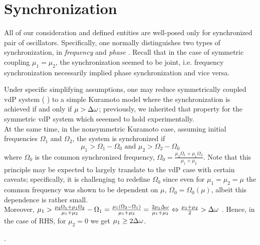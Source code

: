 \documentclass{mynotes}
\begin{document}
\section{ Synchronization }

All of our consideration and defined entities are well-posed only for synchronized pair of oscillators. Specifically, one normally distinguishes two types of synchronization, in \emph{ frequency } and \emph{ phase }. Recall that in the case of symmetric coupling \( \mu_1 = \mu_2 \), the synchronization seemed to be joint, i.e. frequency synchronization necessarily implied phase synchronization and vice versa.

\begin{remark}\label{rem:kuramoto_synch}
      Under specific simplifying assumptions, one may reduce symmetrically coupled vdP system (  ) to a simple Kuramoto model where the synchronization is achieved if and only if \( \mu > \Delta\omega \); previously, we inherited that property for the symmetric vdP system which seeemed to hold experimentally.
      \\[5pt]

      At the same time, in the nonsymmetric Kuramoto case, assuming initial frequencies \( \Omega_1 \) and \( \Omega_2 \), the system is synchronized if \[ \mu_1 > \Omega_1 - \Omega_0  \text{ and } \mu_2 > \Omega_2 - \Omega_0 \] where \( \Omega_0 \) is the common synchronized frequency, \( \Omega_0 = \frac{ \mu_2 \Omega_1 + \mu_1 \Omega_2 }{ \mu_1 + \mu_2 } \). Note that this principle may be expected to largely translate to the vdP case with certain caveats; specifically, it is challenging to redefine \( \Omega_0 \) since even for \( \mu_1 = \mu_2 = \mu \) the common frequency was shown to be dependent on \( \mu \), \( \Omega_0 = \Omega_0 ( \mu ) \), albeit this dependence is rather small.
      \\[5pt]

      Moreover, \( \mu_1 > \frac{ \mu_2 \Omega_1 + \mu_1 \Omega_2 }{ \mu_1 + \mu_2 } - \Omega_1  = \frac{ \mu_1 ( \Omega_2 - \Omega_1 )  }{ \mu_1 + \mu_2 } = \frac{ 2 \mu_1 \Delta\omega  }{ \mu_1 + \mu_2 } \Leftrightarrow \frac{ \mu_1 + \mu_2 }{2} > \Delta\omega \) . Hence, in the case of RHS, for \( \mu_2 = 0 \) we get \( \mu_1 \ge 2 \Delta\omega \).
\end{remark}
.
\end{document}
